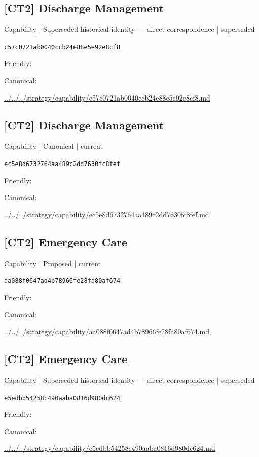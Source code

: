 \documentclass[10pt,a4paper]{article}
\begin{document}
\subsection*{[CT2] Discharge Management}
{\small Capability | Superseded historical identity — direct correspondence | superseded}\par
\texttt{c57c0721ab0040ccb24e88e5e92e8cf8}\par
Friendly: \par
Canonical: \par
{\footnotesize\url{../../../strategy/capability/c57c0721ab0040ccb24e88e5e92e8cf8.md}}\par
\subsection*{[CT2] Discharge Management}
{\small Capability | Canonical | current}\par
\texttt{ec5e8d6732764aa489c2dd7630fc8fef}\par
Friendly: \par
Canonical: \par
{\footnotesize\url{../../../strategy/capability/ec5e8d6732764aa489c2dd7630fc8fef.md}}\par
\subsection*{[CT2] Emergency Care}
{\small Capability | Proposed | current}\par
\texttt{aa088f0647ad4b78966fe28fa80af674}\par
Friendly: \par
Canonical: \par
{\footnotesize\url{../../../strategy/capability/aa088f0647ad4b78966fe28fa80af674.md}}\par
\subsection*{[CT2] Emergency Care}
{\small Capability | Superseded historical identity — direct correspondence | superseded}\par
\texttt{e5edbb54258c490aaba0816d980dc624}\par
Friendly: \par
Canonical: \par
{\footnotesize\url{../../../strategy/capability/e5edbb54258c490aaba0816d980dc624.md}}\par
\end{document}
